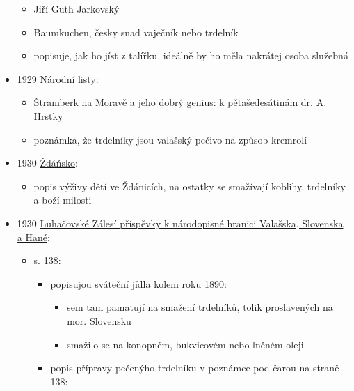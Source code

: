 \begin{itemize}
  \begin{itemize}
  \tightlist
  \item
    Jiří Guth-Jarkovský
  \item
    Baumkuchen, česky snad vaječník nebo trdelník
  \item
    popisuje, jak ho jíst z talířku. ideálně by ho měla nakrátej osoba
    služebná
  \end{itemize}
\item
  1929
  \href{https://ceskadigitalniknihovna.cz/view/uuid:bf47407e-435d-11dd-b505-00145e5790ea?page=uuid\%3A2a4bcb83-435e-11dd-b505-00145e5790ea&fulltext=trdeln\%C3\%ADk\%20OR\%20trdeln\%C3\%ADky\%20OR\%20trdeln\%C3\%ADk\%C5\%AF&source=mzk}{Národní
  listy}:

  \begin{itemize}
  \tightlist
  \item
    Štramberk na Moravě a jeho dobrý genius: k pětašedesátinám dr. A.
    Hrstky
  \item
    poznámka, že trdelníky jsou valašský pečivo na způsob kremrolí
  \end{itemize}
\item
  1930
  \href{https://ceskadigitalniknihovna.cz/view/uuid:e8387412-1c76-452f-9ecf-f705f1af03b3?page=uuid\%3Acd84eba0-525b-11e5-a788-0050569d679d&fulltext=trdeln\%C3\%ADk\%20OR\%20trdeln\%C3\%ADky\%20OR\%20trdeln\%C3\%ADk\%C5\%AF&source=mzk}{Ždáňsko}:

  \begin{itemize}
  \tightlist
  \item
    popis výživy dětí ve Ždánicích, na ostatky se smažívají koblihy,
    trdelníky a boží milosti
  \end{itemize}
\item
  1930
  \href{https://ndk.cz/view/uuid:2d9fa8a0-5063-11e4-8344-005056827e52?page=uuid:1b35e0b0-77b1-11e4-9605-005056825209&fulltext=trdeln\%C3\%ADk\%C5\%AF}{Luhačovské
  Zálesí příspěvky k národopisné hranici Valašska, Slovenska a Hané}:

  \begin{itemize}
  \tightlist
  \item
    s. 138:

    \begin{itemize}
    \tightlist
    \item
      popisujou sváteční jídla kolem roku 1890:

      \begin{itemize}
      \tightlist
      \item
        sem tam pamatují na smažení trdelníků, tolik proslavených na
        mor. Slovensku
      \item
        smažilo se na konopném, bukvicovém nebo lněném oleji
      \end{itemize}
    \item
      popis přípravy pečenýho trdelníku v poznámce pod čarou na straně
      138:


\end{itemize}
\end{itemize}
\end{itemize}
